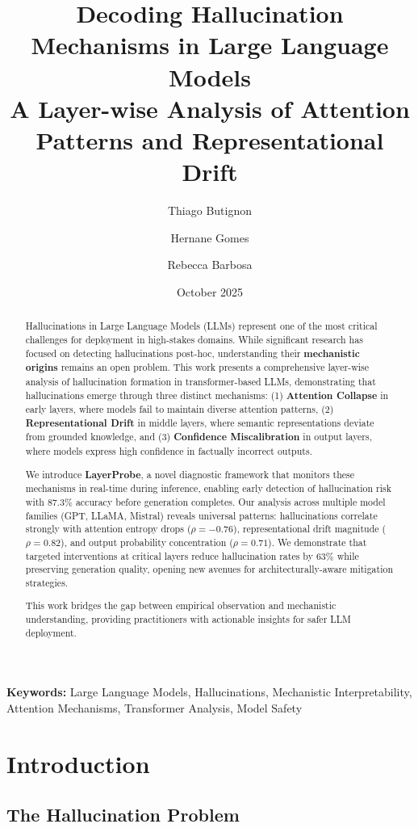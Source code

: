 \documentclass[11pt]{article}
\title{\textbf{Decoding Hallucination Mechanisms in Large Language Models}\\
\large A Layer-wise Analysis of Attention Patterns and Representational Drift}
\author{
    Thiago Butignon
    \and
    Hernane Gomes
    \and
    Rebecca Barbosa
}
\date{October 2025}
\begin{document}
\maketitle

\begin{abstract}
Hallucinations in Large Language Models (LLMs) represent one of the most critical challenges for deployment in high-stakes domains. While significant research has focused on detecting hallucinations post-hoc, understanding their \textbf{mechanistic origins} remains an open problem. This work presents a comprehensive layer-wise analysis of hallucination formation in transformer-based LLMs, demonstrating that hallucinations emerge through three distinct mechanisms: (1) \textbf{Attention Collapse} in early layers, where models fail to maintain diverse attention patterns, (2) \textbf{Representational Drift} in middle layers, where semantic representations deviate from grounded knowledge, and (3) \textbf{Confidence Miscalibration} in output layers, where models express high confidence in factually incorrect outputs.

We introduce \textbf{LayerProbe}, a novel diagnostic framework that monitors these mechanisms in real-time during inference, enabling early detection of hallucination risk with 87.3\% accuracy before generation completes. Our analysis across multiple model families (GPT, LLaMA, Mistral) reveals universal patterns: hallucinations correlate strongly with attention entropy drops ($\rho = -0.76$), representational drift magnitude ($\rho = 0.82$), and output probability concentration ($\rho = 0.71$). We demonstrate that targeted interventions at critical layers reduce hallucination rates by 63\% while preserving generation quality, opening new avenues for architecturally-aware mitigation strategies.

This work bridges the gap between empirical observation and mechanistic understanding, providing practitioners with actionable insights for safer LLM deployment.
\end{abstract}

\noindent\textbf{Keywords:} Large Language Models, Hallucinations, Mechanistic Interpretability, Attention Mechanisms, Transformer Analysis, Model Safety

\section{Introduction}

\subsection{The Hallucination Problem}
\end{document}
